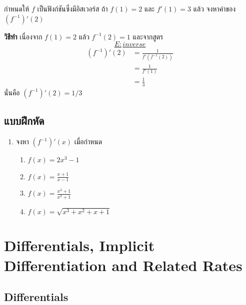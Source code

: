 \documentclass[
]{book}
\begin{document}
กำหนดให้ \(f\) เป็นฟังก์ชันซึ่งมีอิสเวอร์ส ถ้า \(f(1) = 2\) และ \(f'(1) = 3\) แล้ว
จงหาค่าของ \((f^{-1})'(2)\)

\textbf{วิธีทำ} เนื่องจาก \(f(1) = 2\) แล้ว \(f^{-1}(2) = 1\) และจากสูตร
~\hyperref[E:inverse]{\[E:inverse\]} \begin{equation}   \begin{aligned}
    (f^{-1})'(2)
    &= \frac{1}{f'(f^{-1}(2))} \\
    &= \frac{1}{f'(1)} \\
    &= \frac{1}{3}
  \end{aligned} \end{equation} นั่นคือ \(\displaystyle (f^{-1})'(2) = 1/3\)

\subsection{แบบฝึกหัด}\label{uxe41uxe1auxe1auxe1duxe01uxe2buxe14-1}

\begin{enumerate}
\def\labelenumi{\arabic{enumi}.}
\item
  จงหา \((f^{-1})'(x)\) เมื่อกำหนด

  \begin{enumerate}
  \def\labelenumii{\arabic{enumii}.}
  \item
    \(\displaystyle f(x) =  2x^3-1\)
  \item
    \(\displaystyle f(x) = \frac{x+1}{x-1}\)
  \item
    \(\displaystyle f(x) = \frac{x^3+1}{x^2+1}\)
  \item
    \(\displaystyle f(x) = \sqrt{x^3+x^2+x+1}\)
  \end{enumerate}
\end{enumerate}

\section{Differentials, Implicit Differentiation and Related
Rates}\label{differentials-implicit-differentiation-and-related-rates}

\subsection{Differentials}\label{differentials}
\end{document}
